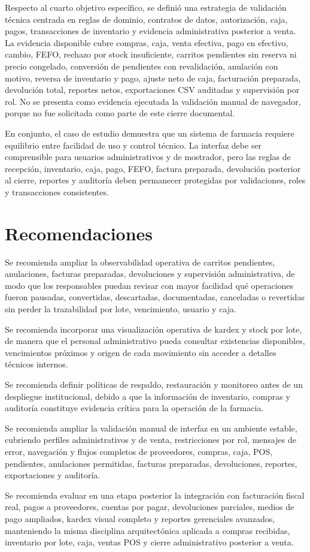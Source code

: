 Respecto al cuarto objetivo específico, se definió una estrategia de validación técnica centrada en reglas de dominio, contratos de datos, autorización, caja, pagos, transacciones de inventario y evidencia administrativa posterior a venta. La evidencia disponible cubre compras, caja, venta efectiva, pago en efectivo, cambio, FEFO, rechazo por stock insuficiente, carritos pendientes sin reserva ni precio congelado, conversión de pendientes con revalidación, anulación con motivo, reversa de inventario y pago, ajuste neto de caja, facturación preparada, devolución total, reportes netos, exportaciones CSV auditadas y supervisión por rol. No se presenta como evidencia ejecutada la validación manual de navegador, porque no fue solicitada como parte de este cierre documental.

En conjunto, el caso de estudio demuestra que un sistema de farmacia requiere equilibrio entre facilidad de uso y control técnico. La interfaz debe ser comprensible para usuarios administrativos y de mostrador, pero las reglas de recepción, inventario, caja, pago, FEFO, factura preparada, devolución posterior al cierre, reportes y auditoría deben permanecer protegidas por validaciones, roles y transacciones consistentes.

\section{Recomendaciones}

Se recomienda ampliar la observabilidad operativa de carritos pendientes, anulaciones, facturas preparadas, devoluciones y supervisión administrativa, de modo que los responsables puedan revisar con mayor facilidad qué operaciones fueron pausadas, convertidas, descartadas, documentadas, canceladas o revertidas sin perder la trazabilidad por lote, vencimiento, usuario y caja.

Se recomienda incorporar una visualización operativa de kardex y stock por lote, de manera que el personal administrativo pueda consultar existencias disponibles, vencimientos próximos y origen de cada movimiento sin acceder a detalles técnicos internos.

Se recomienda definir políticas de respaldo, restauración y monitoreo antes de un despliegue institucional, debido a que la información de inventario, compras y auditoría constituye evidencia crítica para la operación de la farmacia.

Se recomienda ampliar la validación manual de interfaz en un ambiente estable, cubriendo perfiles administrativos y de venta, restricciones por rol, mensajes de error, navegación y flujos completos de proveedores, compras, caja, POS, pendientes, anulaciones permitidas, facturas preparadas, devoluciones, reportes, exportaciones y auditoría.

Se recomienda evaluar en una etapa posterior la integración con facturación fiscal real, pagos a proveedores, cuentas por pagar, devoluciones parciales, medios de pago ampliados, kardex visual completo y reportes gerenciales avanzados, manteniendo la misma disciplina arquitectónica aplicada a compras recibidas, inventario por lote, caja, ventas POS y cierre administrativo posterior a venta.
